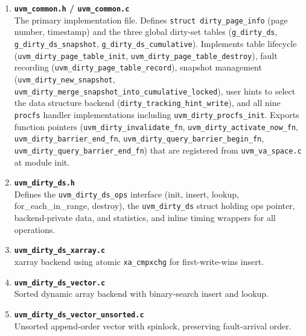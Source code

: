 \begin{enumerate}
    \item \textbf{\texttt{uvm\_common.h} / \texttt{uvm\_common.c }}\\
          The primary implementation file.
          Defines \texttt{struct dirty\_page\_info} (page number, timestamp) and the three
          global dirty-set tables (\texttt{g\_dirty\_ds}, \texttt{g\_dirty\_ds\_snapshot},
          \texttt{g\_dirty\_ds\_cumulative}).
          Implements table lifecycle (\texttt{uvm\_dirty\_page\_table\_init},
          \texttt{uvm\_dirty\_page\_table\_destroy}), fault recording
          (\texttt{uvm\_dirty\_page\_table\_record}), snapshot management
          (\texttt{uvm\_dirty\_new\_snapshot}, \texttt{uvm\_dirty\_merge\_snapshot\_into\_cumulative\_locked}),
          user hints to select the data structure backend (\texttt{dirty\_tracking\_hint\_write}),
          and all nine \texttt{procfs} handler implementations including
          \texttt{uvm\_dirty\_procfs\_init}.
          Exports function pointers (\texttt{uvm\_dirty\_invalidate\_fn},
          \texttt{uvm\_dirty\_activate\_now\_fn}, \texttt{uvm\_dirty\_barrier\_end\_fn},
          \texttt{uvm\_dirty\_query\_barrier\_begin\_fn},
          \texttt{uvm\_dirty\_query\_barrier\_end\_fn}) that are registered from
          \texttt{uvm\_va\_space.c} at module init.\\

    \item \textbf{\texttt{uvm\_dirty\_ds.h}}\\
            Defines the \texttt{uvm\_dirty\_ds\_ops} interface
          (init, insert, lookup, for\_each\_in\_range, destroy), the \texttt{uvm\_dirty\_ds}
          struct holding ops pointer, backend-private data, and statistics, and inline timing
          wrappers for all operations.\\

    \item \textbf{\texttt{uvm\_dirty\_ds\_xarray.c}}\\
          xarray backend using atomic
          \texttt{xa\_cmpxchg} for first-write-wins insert.\\

    \item \textbf{\texttt{uvm\_dirty\_ds\_vector.c}}\\
          Sorted dynamic array backend with
          binary-search insert and lookup.\\

    \item \textbf{\texttt{uvm\_dirty\_ds\_vector\_unsorted.c}}\\
          Unsorted append-order vector
          with spinlock, preserving fault-arrival order.\\


\end{enumerate}
